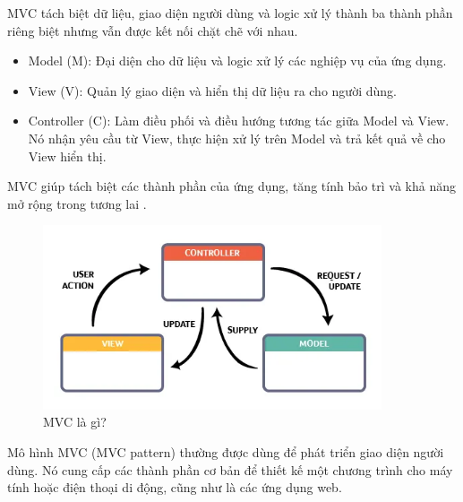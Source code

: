 MVC tách biệt dữ liệu, giao diện người dùng và logic xử lý thành ba thành phần riêng biệt nhưng vẫn được kết nối chặt chẽ với nhau.

\begin{itemize}
    \item Model (M): Đại diện cho dữ liệu và logic xử lý các nghiệp vụ của ứng dụng.
    \item View (V): Quản lý giao diện và hiển thị dữ liệu ra cho người dùng.
    \item Controller (C): Làm điều phối và điều hướng tương tác giữa Model và View. Nó nhận yêu cầu từ View, thực hiện xử lý trên Model và trả kết quả về cho View hiển thị.
\end{itemize}

MVC giúp tách biệt các thành phần của ứng dụng, tăng tính bảo trì và khả năng mở rộng trong tương lai \cite{MVC}.

\begin{figure}[H]
    \centering
    \includegraphics[width=10cm]{Images/ezgif-4-c53032b3fd.png}
    \vspace{0.5cm}
    \caption{MVC là gì?}
    \label{fig:my_label}
\end{figure}

Mô hình MVC (MVC pattern) thường được dùng để phát triển giao diện người dùng. Nó cung cấp các thành phần cơ bản để thiết kế một chương trình cho máy tính hoặc điện thoại di động, cũng như là các ứng dụng web.

